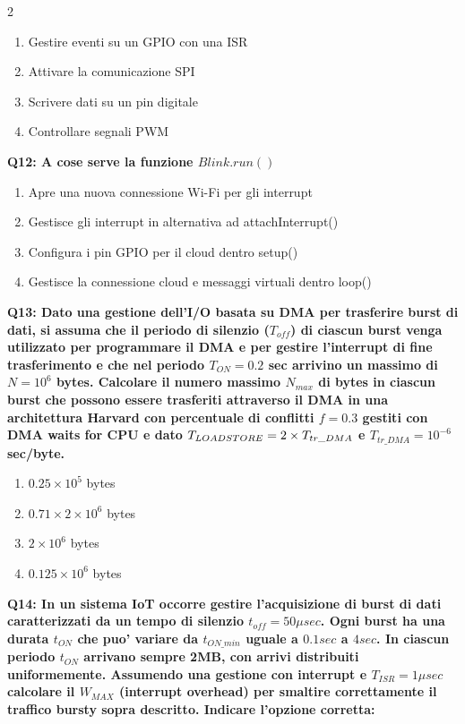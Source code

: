 \documentclass[10pt]{article}
\begin{document}
\begin{multicols}{2}
\begin{enumerate}[label=\arabic*.]
\item Gestire eventi su un GPIO con una ISR
\item Attivare la comunicazione SPI
\item Scrivere dati su un pin digitale
\item Controllare segnali PWM
\end{enumerate}
\textbf{Q12: A cose serve la funzione $Blink.run()$}

\begin{enumerate}[label=\arabic*.]
\item Apre una nuova connessione Wi-Fi per gli interrupt
\item Gestisce gli interrupt in alternativa ad attachInterrupt()
\item Configura i pin GPIO per il cloud dentro setup()
\item Gestisce la connessione cloud e messaggi virtuali dentro loop()
\end{enumerate}
\textbf{Q13: Dato una gestione dell’I/O basata su DMA per trasferire burst di dati, si assuma che il periodo di silenzio  ($T_{off}$) di ciascun burst venga utilizzato per programmare il DMA e per gestire l’interrupt di fine trasferimento e che nel periodo $T_{ON} = 0.2$ sec arrivino un massimo di $N=10^6$ bytes. Calcolare il numero massimo $N_{max}$ di bytes in ciascun burst che possono essere trasferiti attraverso il DMA in una architettura Harvard con percentuale di conflitti $f = 0.3$ gestiti con DMA waits for CPU e dato $T_{LOAD\/STORE} = 2 \times T_{tr\_DMA}$ e $T_{tr\_DMA} = 10^{-6}$ sec/byte.}

\begin{enumerate}[label=\arabic*.]
\item $0.25 \times 10^5$ bytes
\item $0.71 \times 2 \times 10^6$ bytes
\item $2 \times 10^6$ bytes
\item $0.125 \times 10^6$ bytes
\end{enumerate}
\textbf{Q14: In un sistema IoT occorre gestire l'acquisizione di burst di dati caratterizzati da un tempo di silenzio $t_{off}=50\mu sec$. Ogni burst ha una durata $t_{ON}$ che puo' variare da $t_{ON\_min}$ uguale a $0.1 sec$ a $4 sec$. In ciascun periodo $t_{ON}$ arrivano sempre 2MB, con arrivi distribuiti uniformemente.  Assumendo una gestione con interrupt e $T_{ISR}=1 \mu sec$ calcolare il $W_{MAX}$ (interrupt overhead) per smaltire correttamente il traffico bursty sopra descritto.  Indicare l'opzione corretta:}


\end{multicols}
\end{document}
